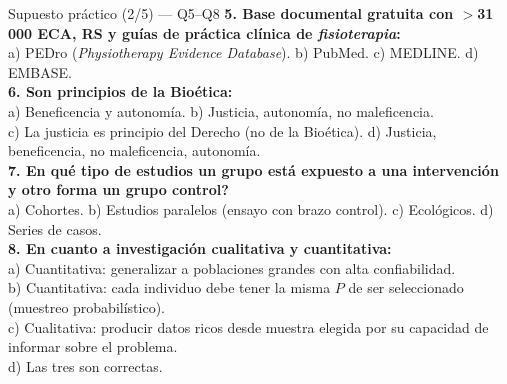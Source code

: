 \documentclass[aspectratio=169,8pt]{beamer}
\begin{document}
\begin{frame}{Supuesto pr\'actico (2/5) --- Q5--Q8}
  \scriptsize
  \textbf{5. Base documental gratuita con $>$31\,000 ECA, RS y gu\'ias de pr\'actica cl\'inica de \emph{fisioterapia}:}\\
  a) PEDro (\emph{Physiotherapy Evidence Database}). \; b) PubMed. \; c) MEDLINE. \; d) EMBASE.\\[4pt]
  \textbf{6. Son principios de la Bio\'etica:}\\
  a) Beneficencia y autonom\'ia. \;
  b) Justicia, autonom\'ia, no maleficencia.\\
  c) La justicia es principio del Derecho (no de la Bio\'etica). \;
  d) Justicia, beneficencia, no maleficencia, autonom\'ia.\\[4pt]
  \textbf{7. \textquestiondown{}En qu\'e tipo de estudios un grupo est\'a expuesto a una intervenci\'on y otro forma un grupo control?}\\
  a) Cohortes. \; b) Estudios paralelos (ensayo con brazo control). \; c) Ecol\'ogicos. \; d) Series de casos.\\[4pt]
  \textbf{8. En cuanto a investigaci\'on cualitativa y cuantitativa:}\\
  a) Cuantitativa: generalizar a poblaciones grandes con alta confiabilidad.\\
  b) Cuantitativa: cada individuo debe tener la misma $P$ de ser seleccionado (muestreo probabil\'istico).\\
  c) Cualitativa: producir datos ricos desde muestra elegida por su capacidad de informar sobre el problema.\\
  d) Las tres son correctas.
\end{frame}
\end{document}
